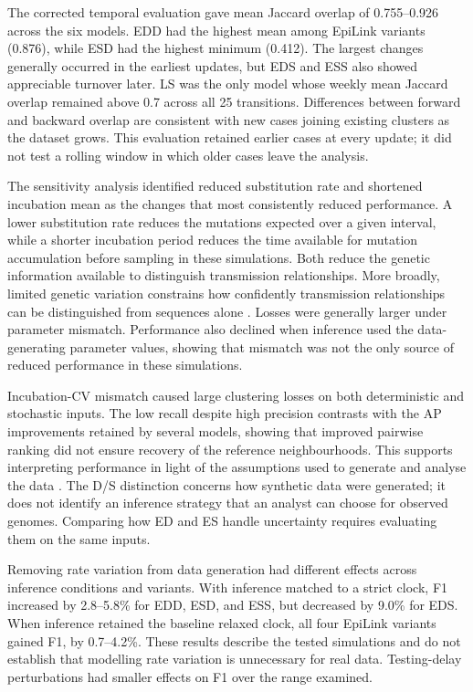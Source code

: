 The corrected temporal evaluation gave mean Jaccard overlap of 0.755--0.926 across the six models. EDD had the highest mean among EpiLink variants (0.876), while ESD had the highest minimum (0.412). The largest changes generally occurred in the earliest updates, but EDS and ESS also showed appreciable turnover later. LS was the only model whose weekly mean Jaccard overlap remained above 0.7 across all 25 transitions. Differences between forward and backward overlap are consistent with new cases joining existing clusters as the dataset grows. This evaluation retained earlier cases at every update; it did not test a rolling window in which older cases leave the analysis.

The sensitivity analysis identified reduced substitution rate and shortened incubation mean as the changes that most consistently reduced performance. A lower substitution rate reduces the mutations expected over a given interval, while a shorter incubation period reduces the time available for mutation accumulation before sampling in these simulations. Both reduce the genetic information available to distinguish transmission relationships. More broadly, limited genetic variation constrains how confidently transmission relationships can be distinguished from sequences alone \citep{Louca2021,Farjo2023,Bendall2022}. Losses were generally larger under parameter mismatch. Performance also declined when inference used the data-generating parameter values, showing that mismatch was not the only source of reduced performance in these simulations.

Incubation-CV mismatch caused large clustering losses on both deterministic and stochastic inputs. The low recall despite high precision contrasts with the AP improvements retained by several models, showing that improved pairwise ranking did not ensure recovery of the reference neighbourhoods. This supports interpreting performance in light of the assumptions used to generate and analyse the data \citep{Campbell2018a,VillabonaArenas2020,Duchene2020,Suster2022}. The D/S distinction concerns how synthetic data were generated; it does not identify an inference strategy that an analyst can choose for observed genomes. Comparing how ED and ES handle uncertainty requires evaluating them on the same inputs.

Removing rate variation from data generation had different effects across inference conditions and variants. With inference matched to a strict clock, F1 increased by 2.8--5.8\% for EDD, ESD, and ESS, but decreased by 9.0\% for EDS. When inference retained the baseline relaxed clock, all four EpiLink variants gained F1, by 0.7--4.2\%. These results describe the tested simulations and do not establish that modelling rate variation is unnecessary for real data. Testing-delay perturbations had smaller effects on F1 over the range examined.

